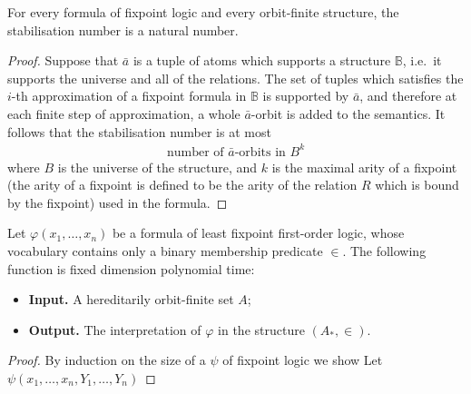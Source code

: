 \begin{lemma}\label{lem:stabilisation-natural}
 For every formula of fixpoint logic and every orbit-finite structure, the stabilisation number is a natural number.
\end{lemma}
\begin{proof} 
 Suppose that $\bar a$ is a tuple of atoms which supports a structure $\mathbb B$, i.e.~it supports the universe and all of the relations. The set of tuples which satisfies the $i$-th approximation of a fixpoint formula in $\mathbb B$ is supported by $\bar a$, and therefore at each finite step of approximation, a whole $\bar a$-orbit is added to the semantics. It follows that the stabilisation number is at most 
\begin{align}
 \text{number of $\bar a$-orbits in $B^k$}
\end{align}
where $B$ is the universe of the structure, and $k$ is the maximal arity of a fixpoint (the arity of a fixpoint is defined to be the arity of the relation $R$ which is bound by the fixpoint) used in the formula.
\end{proof}




\begin{theorem}\label{thm:fdp-fixpoint}
 Let $\varphi(x_1,\ldots,x_n)$ be a formula of least fixpoint first-order logic, whose vocabulary contains only a binary membership predicate $\in$. The following function is fixed dimension polynomial time:
 \begin{itemize}
 \item {\bf Input.} A hereditarily orbit-finite set $A$;
 \item {\bf Output.} The interpretation of $\varphi$ in the structure $(A_*, \in)$.
 \end{itemize}
\end{theorem}
\begin{proof}
 By induction on the size of a $\psi$ of fixpoint logic we show 
 Let $\psi(x_1,\ldots,x_n,Y_1,\ldots,Y_n)$ 
\end{proof}
